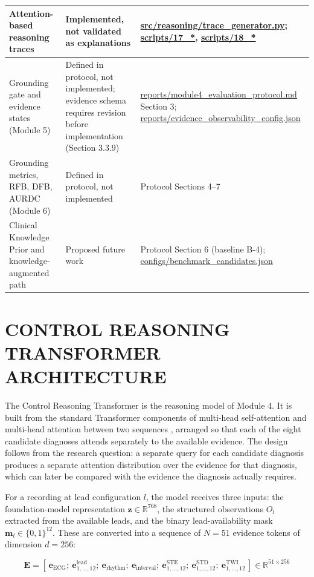 \begin{table}[htbp]
\begin{tabular}{|>{\raggedright\arraybackslash}p{3.7cm}|>{\raggedright\arraybackslash}p{4cm}|>{\raggedright\arraybackslash}p{7cm}|}
Attention-based reasoning traces & Implemented, not validated as explanations & \url{src/reasoning/trace_generator.py}; \url{scripts/17_*}, \url{scripts/18_*} \\ \hline
Grounding gate and evidence states (Module 5) & Defined in protocol, not implemented; evidence schema requires revision before implementation (Section 3.3.9) & \url{reports/module4_evaluation_protocol.md} Section 3; \url{reports/evidence_observability_config.json} \\ \hline
Grounding metrics, RFB, DFB, AURDC (Module 6) & Defined in protocol, not implemented & Protocol Sections 4--7 \\ \hline
Clinical Knowledge Prior and knowledge-augmented path & Proposed future work & Protocol Section 6 (baseline B-4); \url{configs/benchmark_candidates.json} \\ \hline
\end{tabular}
\end{table}

\section{CONTROL REASONING TRANSFORMER ARCHITECTURE}
The Control Reasoning Transformer is the reasoning model of Module 4. It is built from the standard Transformer components of multi-head self-attention and multi-head attention between two sequences \cite{VASWANI2017ATTENTION}, arranged so that each of the eight candidate diagnoses attends separately to the available evidence. The design follows from the research question: a separate query for each candidate diagnosis produces a separate attention distribution over the evidence for that diagnosis, which can later be compared with the evidence the diagnosis actually requires.

For a recording at lead configuration $l$, the model receives three inputs: the foundation-model representation $\mathbf{z} \in \mathbb{R}^{768}$, the structured observations $O_l$ extracted from the available leads, and the binary lead-availability mask $\mathbf{m}_l \in \{0,1\}^{12}$. These are converted into a sequence of $N = 51$ evidence tokens of dimension $d = 256$:

\[
\mathbf{E} = [\,\mathbf{e}_{\text{ECG}};\ \mathbf{e}^{\text{lead}}_{1,\ldots,12};\ \mathbf{e}_{\text{rhythm}};\ \mathbf{e}_{\text{interval}};\ \mathbf{e}^{\text{STE}}_{1,\ldots,12};\ \mathbf{e}^{\text{STD}}_{1,\ldots,12};\ \mathbf{e}^{\text{TWI}}_{1,\ldots,12}\,] \in \mathbb{R}^{51 \times 256}
\]

